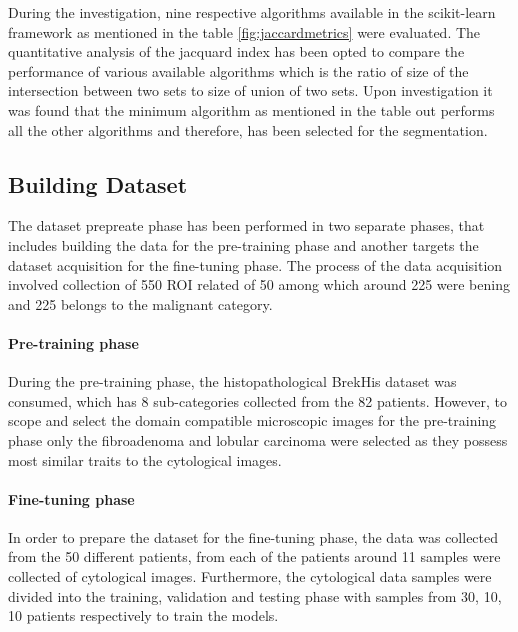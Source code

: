  
During the investigation, nine respective algorithms available in the scikit-learn framework as mentioned in the table  \ref{fig:jaccardmetrics} were evaluated. 
The quantitative analysis of the jacquard index has been opted to compare the performance of various available algorithms which is the ratio of size of the intersection between two sets to size of union of two sets. 
Upon investigation it was found that the minimum algorithm as mentioned in the table out performs all the other algorithms and therefore, has been selected for the segmentation.

\subsection{Building Dataset}

The dataset prepreate phase has been performed in two separate phases, that includes building the data for the pre-training phase and another targets the dataset acquisition for the fine-tuning phase. The process of the data acquisition involved collection of 550 ROI related of 50 among which around 225 were bening and 225 belongs to the malignant category. 

\paragraph*{Pre-training phase}
During the pre-training phase, the histopathological BrekHis dataset was consumed, which has 8 sub-categories collected from the 82 patients. However, to scope and select the domain compatible microscopic images for the pre-training phase only the fibroadenoma and lobular carcinoma were selected as they possess most similar traits to the cytological images. 

\paragraph*{Fine-tuning phase}
In order to prepare the dataset for the fine-tuning phase, the data was collected from the 50 different patients, from each of the patients around 11 samples were collected of cytological images. Furthermore, the cytological data samples were divided into the training, validation and testing phase with samples from  30, 10, 10 patients respectively to train the models.
